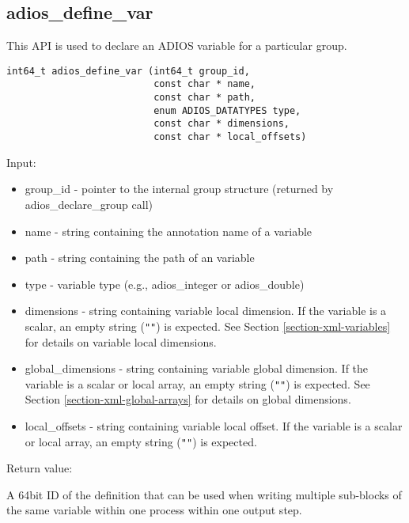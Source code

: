 \subsection{adios\_define\_var}

This API is used to declare an ADIOS variable for a particular group. 
\begin{lstlisting}[alsolanguage=C,caption={},label={}]
int64_t adios_define_var (int64_t group_id, 
                          const char * name,
                          const char * path,
                          enum ADIOS_DATATYPES type,
                          const char * dimensions,
                          const char * local_offsets)
\end{lstlisting}

Input: 
\begin{itemize}
\item group\_id - pointer to the internal group structure (returned by adios\_declare\_group 
call)

\item name - string containing the annotation name of a variable

\item path - string containing the path of an variable 

\item type - variable type (e.g., adios\_integer or adios\_double) 

\item dimensions - string containing variable local dimension. 
If the variable is a scalar, an empty string (\verb+""+) is expected. 
See Section \ref{section-xml-variables} for details on variable local dimensions.

\item global\_dimensions - string containing variable global dimension. If the variable 
is a scalar or local array, an empty string (\verb+""+) is expected. 
See Section \ref{section-xml-global-arrays} for details on global dimensions.

\item local\_offsets - string containing variable local offset. If the variable is a 
scalar or local array, an empty string (\verb+""+) is expected.
\end{itemize}

Return value:

A 64bit ID of the definition that can be used when writing multiple sub-blocks 
of the same variable within one process within one output step. 

